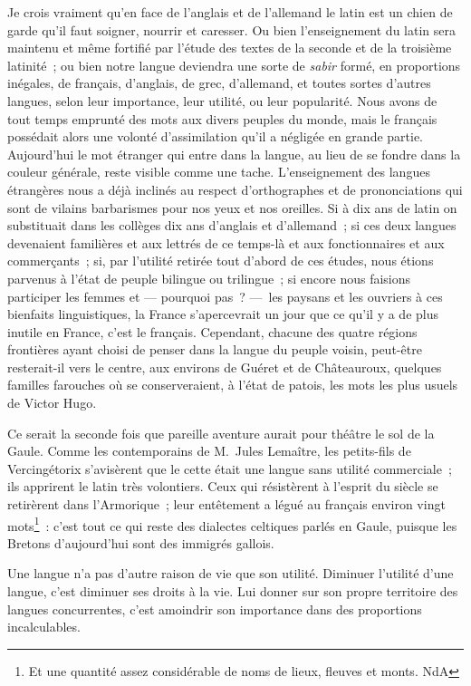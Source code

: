 \documentclass[french,twoside]{book} %
\begin{document}
Je crois vraiment qu’en face de l’anglais et de l’allemand le latin est un chien de garde qu’il faut soigner, nourrir et caresser. Ou bien l’enseignement du latin sera maintenu et même fortifié par l’étude des textes de la seconde et de la troisième latinité ; ou bien notre langue deviendra une sorte de {\itshape sabir} formé, en proportions inégales, de français, d’anglais, de grec, d’allemand, et toutes sortes d’autres langues, selon leur importance, leur utilité, ou leur popularité. Nous avons de tout temps emprunté des mots aux divers peuples du monde, mais le français possédait alors une volonté d’assimilation qu’il a négligée en grande partie. Aujourd’hui le mot étranger qui entre dans la langue, au lieu de se fondre dans la couleur générale, reste visible comme une tache. L’enseignement des langues étrangères nous a déjà inclinés au respect d’orthographes et de prononciations qui sont de vilains barbarismes pour nos yeux et nos oreilles. Si à dix ans de latin on substituait dans les collèges dix ans d’anglais et d’allemand ; si ces deux langues devenaient familières et aux lettrés de ce temps-là et aux fonctionnaires et aux commerçants ; si, par l’utilité retirée tout d’abord de ces études, nous étions parvenus à l’état de peuple bilingue ou trilingue ; si encore nous faisions participer les femmes et — pourquoi pas ? — les paysans et les ouvriers à ces bienfaits linguistiques, la France s’apercevrait un jour que ce qu’il y a de plus inutile en France, c’est le français. Cependant, chacune des quatre régions frontières ayant choisi de penser dans la langue du peuple voisin, peut-être resterait-il vers le centre, aux environs de Guéret et de Châteauroux, quelques familles farouches où se conserveraient, à l’état de patois, les mots les plus usuels de Victor Hugo.\par
Ce serait la seconde fois que pareille aventure aurait pour théâtre le sol de la Gaule. Comme les contemporains de M. Jules Lemaître, les petits-fils de Vercingétorix s’avisèrent que le cette était une langue sans utilité commerciale ; ils apprirent le latin très volontiers. Ceux qui résistèrent à l’esprit du siècle se retirèrent dans l’Armorique ; leur entêtement a légué au français environ vingt mots\footnote{Et une quantité assez considérable de noms de lieux, fleuves et monts. NdA} : c’est tout ce qui reste des dialectes celtiques parlés en Gaule, puisque les Bretons d’aujourd’hui sont des immigrés gallois.\par
Une langue n’a pas d’autre raison de vie que son utilité. Diminuer l’utilité d’une langue, c’est diminuer ses droits à la vie. Lui donner sur son propre territoire des langues concurrentes, c’est amoindrir son importance dans des proportions incalculables.\par
\end{document}
